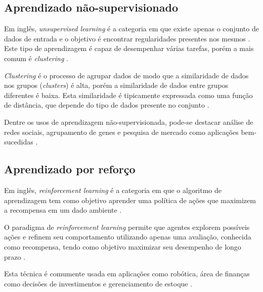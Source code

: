 \subsection{Aprendizado não-supervisionado}

Em inglês, \textit{unsupervised learning} é a categoria em que existe apenas o conjunto de dados de entrada e o objetivo é encontrar regularidades presentes nos mesmos \cite{alpaydin2020introduction}. Este tipo de aprendizagem é capaz de desempenhar várias tarefas, porém a mais comum é \textit{clustering} \cite{8527529}.

\textit{Clustering} é o processo de agrupar dados de modo que a similaridade de dados nos grupos (\textit{clusters}) é alta, porém a similaridade de dados entre grupos diferentes é baixa. Esta similaridade é tipicamente expressada como uma função de distância, que depende do tipo de dados presente no conjunto \cite{8527529}.

Dentre os usos de aprendizagem não-supervisionada, pode-se destacar análise de redes sociais, agrupamento de genes e pesquisa de mercado como aplicações bem-sucedidas \cite{8527529}.

\subsection{Aprendizado por reforço}

Em inglês, \textit{reinforcement learning} é a categoria em que o algoritmo de aprendizagem tem como objetivo aprender uma política de ações que maximizem a recompensa em um dado ambiente \cite{alpaydin2020introduction}.

O paradigma de \textit{reinforcement learning} permite que agentes explorem possíveis ações e refinem seu comportamento utilizando apenas uma avaliação, conhecida como recompensa, tendo como objetivo maximizar seu desempenho de longo prazo \cite{8527529}.

Esta técnica é comumente usada em aplicações como robótica, área de finanças como decisões de investimentos e gerenciamento de estoque \cite{8527529}.







